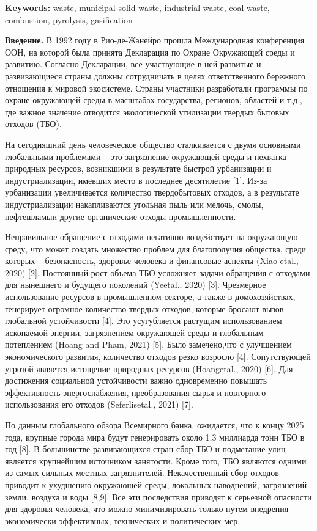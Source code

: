 {\bfseries Keywords:} waste, municipal solid waste, industrial waste, coal
waste, combustion, pyrolysis, gasification

\begin{multicols}{2}
{\bfseries Введение.} В 1992 году в Рио-де-Жанейро прошла Международная
конференция ООН, на которой была принята Декларация по Охране Окружающей
среды и развитию. Согласно Декларации, все участвующие в ней развитые и
развивающиеся страны должны сотрудничать в целях ответственного
бережного отношения к мировой экосистеме. Страны участники разработали
программы по охране окружающей среды в масштабах государства, регионов,
областей и т.д., где важное значение отводится экологической утилизации
твердых бытовых отходов (ТБО).

На сегодняшний день человеческое общество сталкивается с двумя основными
глобальными проблемами -- это загрязнение окружающей среды и нехватка
природных ресурсов, возникшими в результате быстрой урбанизации и
индустриализации, имевших место в последнее десятилетие {[}1{]}. Из-за
урбанизации увеличивается количество твердобытовых отходов, а в
результате индустриализации накапливаются угольная пыль или мелочь,
смолы, нефтешламыи другие органические отходы промышленности.

Неправильное обращение с отходами негативно воздействует на окружающую
среду, что может создать множество проблем для благополучия общества,
среди которых -- безопасность, здоровье человека и финансовые аспекты
(Xiao etal., 2020) {[}2{]}. Постоянный рост объема ТБО усложняет задачи
обращения с отходами для нынешнего и будущего поколений (Yeetal., 2020)
{[}3{]}. Чрезмерное использование ресурсов в промышленном секторе, а
также в домохозяйствах, генерирует огромное количество твердых отходов,
которые бросают вызов глобальной устойчивости {[}4{]}. Это усугубляется
растущим использованием ископаемой энергии, загрязнением окружающей
среды и глобальным потеплением (Hoang and Pham, 2021) {[}5{]}. Было
замечено,что с улучшением экономического развития, количество отходов
резко возросло {[}4{]}. Сопутствующей угрозой является истощение
природных ресурсов (Hoangetal., 2020) {[}6{]}. Для достижения социальной
устойчивости важно одновременно повышать эффективность энергоснабжения,
преобразования сырья и повторного использования его отходов
(Seferlisetal., 2021) {[}7{]}.

По данным глобального обзора Всемирного банка, ожидается, что к концу
2025 года, крупные города мира будут генерировать около 1,3 миллиарда
тонн ТБО в год {[}8{]}. В большинстве развивающихся стран сбор ТБО и
подметание улиц является крупнейшим источником занятости. Кроме того,
ТБО являются одними из самых сильных местных загрязнителей.
Некачественный сбор отходов приводит к ухудшению окружающей среды,
локальных наводнений, загрязнений земли, воздуха и воды {[}8,9{]}. Все
эти последствия приводят к серьезной опасности для здоровья человека,
что можно минимизировать только путем внедрения экономически
эффективных, технических и политических мер.


\end{multicols}
